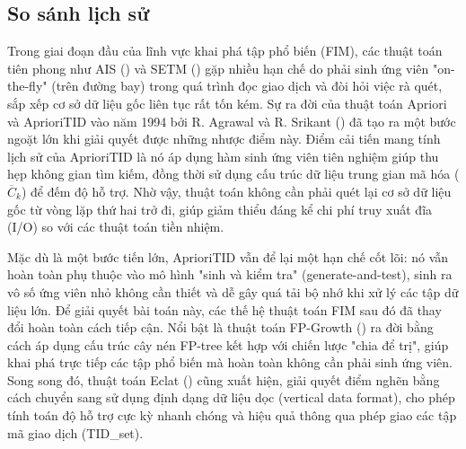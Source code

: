 \subsection{So sánh lịch sử}
Trong giai đoạn đầu của lĩnh vực khai phá tập phổ biến (FIM), các thuật toán tiên phong như AIS (\cite{AgrawalImielinskiSwami1993}) và SETM (\cite{HoutsmaSwami1995SETM}) gặp nhiều hạn chế do phải sinh ứng viên "on-the-fly" (trên đường bay) trong quá trình đọc giao dịch và đòi hỏi việc rà quét, sắp xếp cơ sở dữ liệu gốc liên tục rất tốn kém. Sự ra đời của thuật toán Apriori và AprioriTID vào năm 1994 bởi R. Agrawal và R. Srikant (\cite{AgrawalSrikant1994}) đã tạo ra một bước ngoặt lớn khi giải quyết được những nhược điểm này. Điểm cải tiến mang tính lịch sử của AprioriTID là nó áp dụng hàm sinh ứng viên tiên nghiệm giúp thu hẹp không gian tìm kiếm, đồng thời sử dụng cấu trúc dữ liệu trung gian mã hóa ($\overline{C}_k$) để đếm độ hỗ trợ. Nhờ vậy, thuật toán không cần phải quét lại cơ sở dữ liệu gốc từ vòng lặp thứ hai trở đi, giúp giảm thiểu đáng kể chi phí truy xuất đĩa (I/O) so với các thuật toán tiền nhiệm.

Mặc dù là một bước tiến lớn, AprioriTID vẫn để lại một hạn chế cốt lõi: nó vẫn hoàn toàn phụ thuộc vào mô hình "sinh và kiểm tra" (generate-and-test), sinh ra vô số ứng viên nhỏ không cần thiết và dễ gây quá tải bộ nhớ khi xử lý các tập dữ liệu lớn. Để giải quyết bài toán này, các thế hệ thuật toán FIM sau đó đã thay đổi hoàn toàn cách tiếp cận. Nổi bật là thuật toán FP-Growth (\cite{HanPeiYin2000FPGrowth}) ra đời bằng cách áp dụng cấu trúc cây nén FP-tree kết hợp với chiến lược "chia để trị", giúp khai phá trực tiếp các tập phổ biến mà hoàn toàn không cần phải sinh ứng viên. Song song đó, thuật toán Eclat (\cite{Zaki2000Eclat}) cũng xuất hiện, giải quyết điểm nghẽn bằng cách chuyển sang sử dụng định dạng dữ liệu dọc (vertical data format), cho phép tính toán độ hỗ trợ cực kỳ nhanh chóng và hiệu quả thông qua phép giao các tập mã giao dịch (TID\_set).

